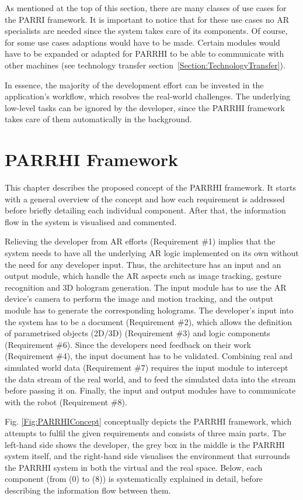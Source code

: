 As mentioned at the top of this section, there are many classes of use cases for the PARRI framework. It is important to notice that for these use cases no AR specialists are needed since the system takes care of its components. Of course, for some use cases adaptions would have to be made. Certain modules would have to be expanded or adapted for PARRHI to be able to communicate with other machines (see technology transfer section~\ref{Section:TechnologyTransfer}). 

In essence, the majority of the development effort can be invested in the application’s workflow, which resolves the real-world challenges. The underlying low-level tasks can be ignored by the developer, since the PARRHI framework takes care of them automatically in the background. 

\section{PARRHI Framework}

This chapter describes the proposed concept of the PARRHI framework. It starts with a general overview of the concept and how each requirement is addressed before briefly detailing each individual component. After that, the information flow in the system is visualised and commented.

Relieving the developer from AR efforts (Requirement \#1) implies that the system needs to have all the underlying AR logic implemented on its own without the need for any developer input. Thus, the architecture has an input and an output module, which handle the AR aspects such as image tracking, gesture recognition and 3D hologram generation. The input module has to use the AR device’s camera to perform the image and motion tracking, and the output module has to generate the corresponding holograms. The developer’s input into the system has to be a document (Requirement \#2), which allows the definition of parametrised objects (2D/3D) (Requirement \#3) and logic components (Requirement \#6). Since the developers need feedback on their work (Requirement \#4), the input document has to be validated. Combining real and simulated world data (Requirement \#7) requires the input module to intercept the data stream of the real world, and to feed the simulated data into the stream before passing it on. Finally, the input and output modules have to communicate with the robot (Requirement \#8).

Fig. \ref{Fig:PARRHIConcept} conceptually depicts the PARRHI framework, which attempts to fulfil the given requirements and consists of three main parts. The left-hand side shows the developer, the grey box in the middle is the PARRHI system itself, and the right-hand side visualises the environment that surrounds the PARRHI system in both the virtual and the real space. Below, each component (from (0) to (8))  is systematically explained in detail, before describing the information flow between them.

